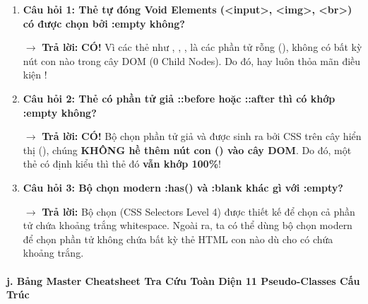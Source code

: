 \begin{warnBox}
\begin{enumerate}[leftmargin=1.5em, itemsep=5pt, parsep=0pt]
    \item \textbf{Câu hỏi 1: Thẻ tự đóng Void Elements (<input>, <img>, <br>) có được chọn bởi :empty không?} \par
    $\rightarrow$ \textbf{Trả lời:} \textbf{CÓ!} Vì các thẻ như , , ,  là các phần tử rỗng (), không có bất kỳ nút con nào trong cây DOM (0 Child Nodes). Do đó,  hay  luôn thỏa mãn điều kiện !

    \item \textbf{Câu hỏi 2: Thẻ có phần tử giả ::before hoặc ::after thì có khớp :empty không?} \par
    $\rightarrow$ \textbf{Trả lời:} \textbf{CÓ!} Bộ chọn phần tử giả  và  được sinh ra bởi CSS trên cây hiển thị (), chúng \textbf{KHÔNG hề thêm nút con () vào cây DOM}. Do đó, một thẻ  có định kiểu  thì thẻ đó \textbf{vẫn khớp  100\%}!

    \item \textbf{Câu hỏi 3: Bộ chọn modern :has() và :blank khác gì với :empty?} \par
    $\rightarrow$ \textbf{Trả lời:} Bộ chọn  (CSS Selectors Level 4) được thiết kế để chọn cả phần tử chứa khoảng trắng whitespace. Ngoài ra, ta có thể dùng bộ chọn modern  để chọn phần tử không chứa bất kỳ thẻ HTML con nào dù cho có chứa khoảng trắng.
\end{enumerate}
\end{warnBox}

\paragraph{j. Bảng Master Cheatsheet Tra Cứu Toàn Diện 11 Pseudo-Classes Cấu Trúc}

